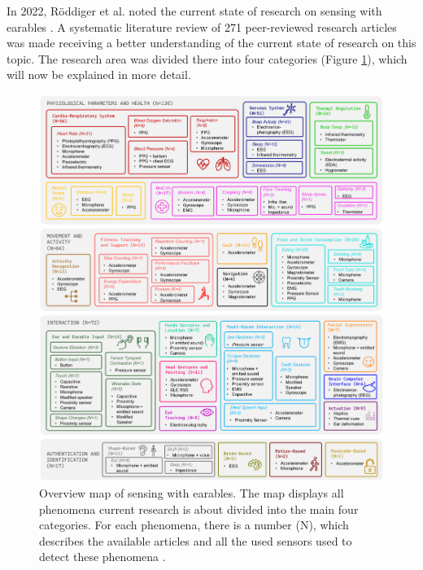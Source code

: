 In 2022, Röddiger et al. noted the current state of research on sensing with earables \cite{roddigerSensingEarablesSystematic2022a}.
A systematic literature review of 271 peer-reviewed research articles was made receiving a better understanding of the current state of research on this topic.
The research area was divided there into four categories (Figure \ref{fig:sensing_with_earables_overview}), which will now be explained in more detail.

\begin{figure}[t!]
    \centering
    \includegraphics[scale=0.3525]{thesis-doc/images/sensing_with_earables_overview.png}
    \caption{Overview map of sensing with earables. The map displays all phenomena current research is about divided into the main four categories. For each phenomena, there is a number (N), which describes the available articles and all the used sensors used to detect these phenomena \cite{roddigerSensingEarablesSystematic2022a}.}
    \label{fig:sensing_with_earables_overview}
\end{figure}

